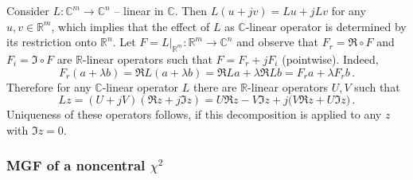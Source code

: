 \documentclass[a4paper,10pt]{article}
\newcommand{\real}{\mathbb{R}}
\newcommand{\cplx}{\mathbb{C}}
\begin{document}
Consider $L \colon \cplx^m \to \cplx^n$ -- linear in $\cplx$. Then $
  L(u + jv) = L u + j L v
$ for any $u, v \in \real^m$, which implies that the effect of $L$ as $\cplx$-linear
operator is determined by its restriction onto $\real^n$. Let $
  F = L\vert_{\real^m}
  \colon \real^m \to \cplx^n
$ and observe that $F_r = \Re \circ F$ and $F_i = \Im \circ F$ are $\real$-linear operators
such that $F = F_r + j F_i$ (pointwise). Indeed,
$$
  F_r(a + \lambda b)
  = \Re L(a + \lambda b)
  = \Re L a + \lambda \Re L b
  = F_r a + \lambda F_r b
  \,. $$
Therefore for any $\cplx$-linear operator $L$ there are $\real$-linear operators $U, V$
such that
$$
L z 
  = (U + j V) (\Re z + j \Im z)
  = U \Re z - V \Im z + j \bigl( V \Re z + U \Im z \bigr)
  \,. $$
Uniqueness of these operators follows, if this decomposition is applied to any $z$ with
$\Im z = 0$.


\subsubsection{MGF of a noncentral $\chi^2$} %
\label{ssub:mgf_of_a_noncentral_chi}
\end{document}
